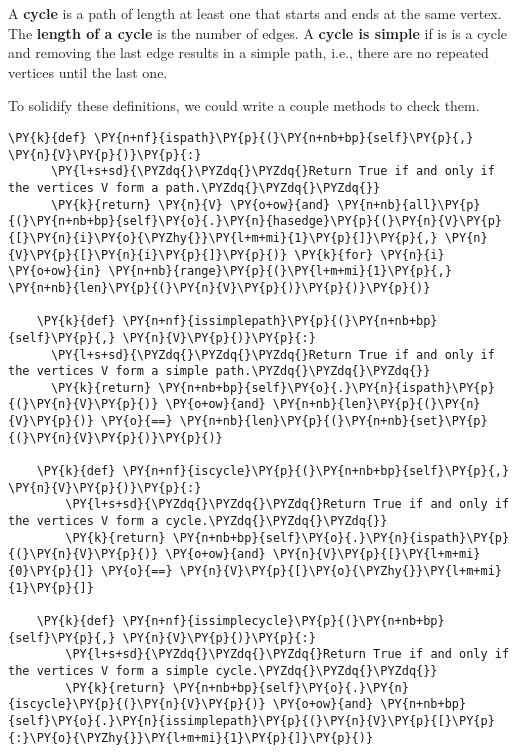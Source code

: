 A \textbf{cycle} is a path of length at least one that starts and ends at the same vertex.
The \textbf{length of a cycle} is the number of edges.
A \textbf{cycle is simple} if is is a cycle and removing the last edge results in a simple path, i.e., there are no repeated vertices until the last one.


To solidify these definitions, we could write a couple methods to check them.

\begin{Verbatim}[commandchars=\\\{\}]
    \PY{k}{def} \PY{n+nf}{ispath}\PY{p}{(}\PY{n+nb+bp}{self}\PY{p}{,} \PY{n}{V}\PY{p}{)}\PY{p}{:}
      \PY{l+s+sd}{\PYZdq{}\PYZdq{}\PYZdq{}Return True if and only if the vertices V form a path.\PYZdq{}\PYZdq{}\PYZdq{}}
      \PY{k}{return} \PY{n}{V} \PY{o+ow}{and} \PY{n+nb}{all}\PY{p}{(}\PY{n+nb+bp}{self}\PY{o}{.}\PY{n}{hasedge}\PY{p}{(}\PY{n}{V}\PY{p}{[}\PY{n}{i}\PY{o}{\PYZhy{}}\PY{l+m+mi}{1}\PY{p}{]}\PY{p}{,} \PY{n}{V}\PY{p}{[}\PY{n}{i}\PY{p}{]}\PY{p}{)} \PY{k}{for} \PY{n}{i} \PY{o+ow}{in} \PY{n+nb}{range}\PY{p}{(}\PY{l+m+mi}{1}\PY{p}{,} \PY{n+nb}{len}\PY{p}{(}\PY{n}{V}\PY{p}{)}\PY{p}{)}\PY{p}{)}

    \PY{k}{def} \PY{n+nf}{issimplepath}\PY{p}{(}\PY{n+nb+bp}{self}\PY{p}{,} \PY{n}{V}\PY{p}{)}\PY{p}{:}
      \PY{l+s+sd}{\PYZdq{}\PYZdq{}\PYZdq{}Return True if and only if the vertices V form a simple path.\PYZdq{}\PYZdq{}\PYZdq{}}
      \PY{k}{return} \PY{n+nb+bp}{self}\PY{o}{.}\PY{n}{ispath}\PY{p}{(}\PY{n}{V}\PY{p}{)} \PY{o+ow}{and} \PY{n+nb}{len}\PY{p}{(}\PY{n}{V}\PY{p}{)} \PY{o}{==} \PY{n+nb}{len}\PY{p}{(}\PY{n+nb}{set}\PY{p}{(}\PY{n}{V}\PY{p}{)}\PY{p}{)}

    \PY{k}{def} \PY{n+nf}{iscycle}\PY{p}{(}\PY{n+nb+bp}{self}\PY{p}{,} \PY{n}{V}\PY{p}{)}\PY{p}{:}
        \PY{l+s+sd}{\PYZdq{}\PYZdq{}\PYZdq{}Return True if and only if the vertices V form a cycle.\PYZdq{}\PYZdq{}\PYZdq{}}
        \PY{k}{return} \PY{n+nb+bp}{self}\PY{o}{.}\PY{n}{ispath}\PY{p}{(}\PY{n}{V}\PY{p}{)} \PY{o+ow}{and} \PY{n}{V}\PY{p}{[}\PY{l+m+mi}{0}\PY{p}{]} \PY{o}{==} \PY{n}{V}\PY{p}{[}\PY{o}{\PYZhy{}}\PY{l+m+mi}{1}\PY{p}{]}

    \PY{k}{def} \PY{n+nf}{issimplecycle}\PY{p}{(}\PY{n+nb+bp}{self}\PY{p}{,} \PY{n}{V}\PY{p}{)}\PY{p}{:}
        \PY{l+s+sd}{\PYZdq{}\PYZdq{}\PYZdq{}Return True if and only if the vertices V form a simple cycle.\PYZdq{}\PYZdq{}\PYZdq{}}
        \PY{k}{return} \PY{n+nb+bp}{self}\PY{o}{.}\PY{n}{iscycle}\PY{p}{(}\PY{n}{V}\PY{p}{)} \PY{o+ow}{and} \PY{n+nb+bp}{self}\PY{o}{.}\PY{n}{issimplepath}\PY{p}{(}\PY{n}{V}\PY{p}{[}\PY{p}{:}\PY{o}{\PYZhy{}}\PY{l+m+mi}{1}\PY{p}{]}\PY{p}{)}
\end{Verbatim}




